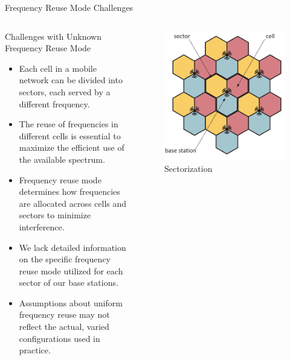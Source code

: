 \begin{frame}{Frequency Reuse Mode Challenges}
    \begin{columns}
        \begin{column}{0.55\textwidth}
            \begin{block}{Challenges with Unknown Frequency Reuse Mode}
                    \begin{itemize}
                        \item Each cell in a mobile network can be divided into sectors, each served by a different frequency.
                        \item The reuse of frequencies in different cells is essential to maximize the efficient use of the available spectrum.
                        \item Frequency reuse mode determines how frequencies are allocated across cells and sectors to minimize interference.
                        \item We lack detailed information on the specific frequency reuse mode utilized for each sector of our base stations.
                        \item Assumptions about uniform frequency reuse may not reflect the actual, varied configurations used in practice.
                    \end{itemize}
            \end{block}
        \end{column}
        \begin{column}{0.6\textwidth}
            \begin{figure}
                \includegraphics[height=0.4\paperheight]{images/Altair/Sectorization.png}
                \caption{Sectorization}
            \end{figure}
        \end{column}
    \end{columns}
\end{frame}